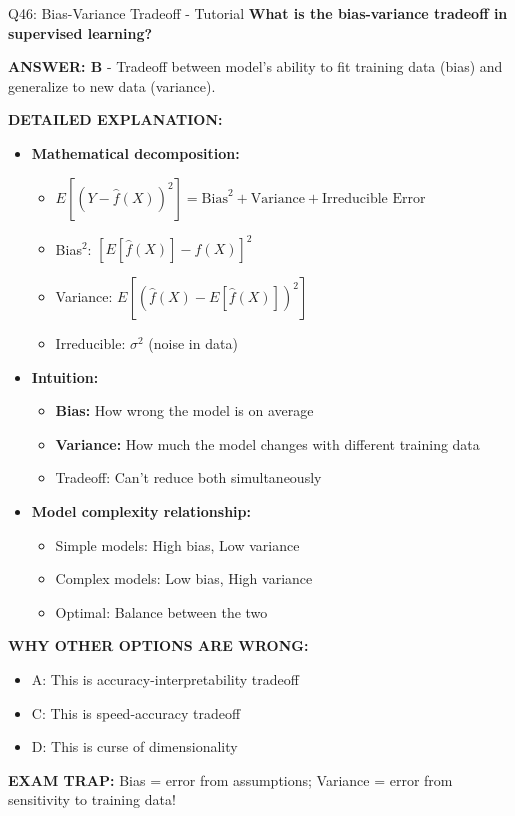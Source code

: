 \documentclass[8pt]{beamer}
\begin{document}
	
	\begin{frame}{Q46: Bias-Variance Tradeoff - Tutorial}
		\fontsize{6.5}{7.5}\selectfont
		\textbf{What is the bias-variance tradeoff in supervised learning?}
		
		\vspace{0.05cm}
		\textcolor{myblue}{\textbf{ANSWER: B}} - Tradeoff between model's ability to fit training data (bias) and generalize to new data (variance).
		
		\vspace{0.05cm}
		\textbf{DETAILED EXPLANATION:}
		\begin{itemize}
			\item \textbf{Mathematical decomposition:}
			\begin{itemize}
				\item $E[(Y - \hat{f}(X))^2] = \text{Bias}^2 + \text{Variance} + \text{Irreducible Error}$
				\item Bias$^2$: $[E[\hat{f}(X)] - f(X)]^2$
				\item Variance: $E[(\hat{f}(X) - E[\hat{f}(X)])^2]$
				\item Irreducible: $\sigma^2$ (noise in data)
			\end{itemize}
			\item \textbf{Intuition:}
			\begin{itemize}
				\item \textbf{Bias:} How wrong the model is on average
				\item \textbf{Variance:} How much the model changes with different training data
				\item Tradeoff: Can't reduce both simultaneously
			\end{itemize}
			\item \textbf{Model complexity relationship:}
			\begin{itemize}
				\item Simple models: High bias, Low variance
				\item Complex models: Low bias, High variance
				\item Optimal: Balance between the two
			\end{itemize}
		\end{itemize}
		
		\vspace{0.05cm}
		\textcolor{myred}{\textbf{WHY OTHER OPTIONS ARE WRONG:}}
		\begin{itemize}
			\item \textcolor{myred}{A:} This is accuracy-interpretability tradeoff
			\item \textcolor{myred}{C:} This is speed-accuracy tradeoff
			\item \textcolor{myred}{D:} This is curse of dimensionality
		\end{itemize}
		
		\textcolor{myred}{\textbf{EXAM TRAP:}} Bias = error from assumptions; Variance = error from sensitivity to training data!
	\end{frame}
	
\end{document}
